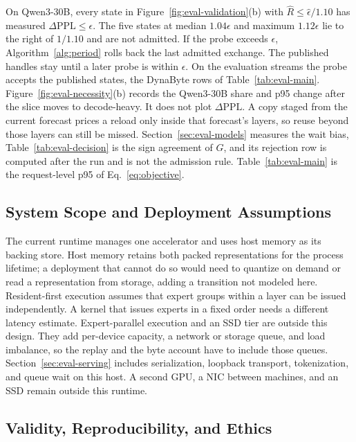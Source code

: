 On Qwen3-30B, every state in Figure~\ref{fig:eval-validation}(b) with \(\widehat R\le\widehat\epsilon/1.10\) has measured \(\Delta\mathrm{PPL}\le\epsilon\).
The five states at median \(1.04\epsilon\) and maximum \(1.12\epsilon\) lie to the right of \(1/1.10\) and are not admitted.
If the probe exceeds \(\epsilon\), Algorithm~\ref{alg:period} rolls back the last admitted exchange. The published handles stay until a later probe is within \(\epsilon\).
On the evaluation streams the probe accepts the published states, the DynaByte rows of Table~\ref{tab:eval-main}.
Figure~\ref{fig:eval-necessity}(b) records the Qwen3-30B share and p95 change after the slice moves to decode-heavy. It does not plot \(\Delta\mathrm{PPL}\).
A copy staged from the current forecast prices a reload only inside that forecast's layers, so reuse beyond those layers can still be missed.
Section~\ref{sec:eval-models} measures the wait bias, Table~\ref{tab:eval-decision} is the sign agreement of \(G\), and its rejection row is computed after the run and is not the admission rule. Table~\ref{tab:eval-main} is the request-level p95 of Eq.~\eqref{eq:objective}.

\subsection{System Scope and Deployment Assumptions}
\label{sec:non-goals}

The current runtime manages one accelerator and uses host memory as its backing store.
Host memory retains both packed representations for the process lifetime; a deployment that cannot do so would need to quantize on demand or read a representation from storage, adding a transition not modeled here.
Resident-first execution assumes that expert groups within a layer can be issued independently.
A kernel that issues experts in a fixed order needs a different latency estimate.
Expert-parallel execution and an SSD tier are outside this design.
They add per-device capacity, a network or storage queue, and load imbalance, so the replay and the byte account have to include those queues.
Section~\ref{sec:eval-serving} includes serialization, loopback transport, tokenization, and queue wait on this host. A second GPU, a NIC between machines, and an SSD remain outside this runtime.

\subsection{Validity, Reproducibility, and Ethics}
\label{sec:threats}
\label{sec:ethics}

